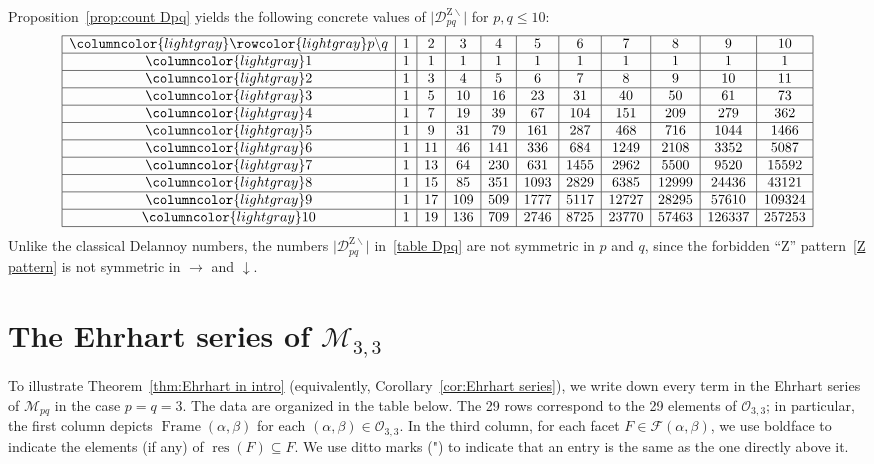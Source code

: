 \documentclass[noamsfonts,10pt]{amsart}
\newcommand{\M}{\mathcal{M}}
\newcommand{\DZ}{\mathcal{D}^{\mathrm{Z} \!\!\!\! \backslash}}
\newcommand{\al}{\alpha}
\newcommand{\be}{\beta}
\DeclareMathOperator{\Fr}{Frame}
\renewcommand{\O}{\mathcal{O}}
\newcommand{\F}{\mathcal{F}}
\newcommand{\res}{\operatorname{res}}
\newcommand{\1}{\mathbf{1}}
\theoremstyle{plain}
\theoremstyle{definition}
\numberwithin{equation}{section}
\begin{document}
Proposition~\ref{prop:count Dpq} yields the following concrete values of $\bigl| \DZ_{pq} \bigr|$ for $p,q \leq 10$:
\begin{equation}
    \label{table Dpq}
    \begin{array}{|>{\columncolor{lightgray}}c |c|c|c|c|c|c|c|c|c|c|}
    \hline
    \rowcolor{lightgray} p \backslash q & 1 & 2 & 3 & 4 & 5 & 6 & 7 & 8 & 9 & 10 \\ \hline
    1 & 1 & 1 & 1 & 1 & 1 & 1 & 1 & 1 & 1 & 1 \\ \hline
    2 & 1 & 3 & 4 & 5 & 6 & 7 & 8 & 9 & 10 & 11 \\ \hline
    3 & 1 & 5 & 10 & 16 & 23 & 31 & 40 & 50 & 61 & 73 \\ \hline
    4 & 1 & 7 & 19 & 39 & 67 & 104 & 151 & 209 & 279 & 362 \\ \hline
    5 & 1 & 9 & 31 & 79 & 161 & 287 & 468 & 716 & 1044 & 1466 \\ \hline
    6 & 1 & 11 & 46 & 141 & 336 & 684 & 1249 & 2108 & 3352 & 5087 \\ \hline
    7 & 1 & 13 & 64 & 230 & 631 & 1455 & 2962 & 5500 & 9520 & 15592 \\ \hline
    8 & 1 & 15 & 85 & 351 & 1093 & 2829 & 6385 & 12999 & 24436 & 43121 \\ \hline
    9 & 1 & 17 & 109 & 509 & 1777 & 5117 & 12727 & 28295 & 57610 & 109324 \\ \hline
    10 & 1 & 19 & 136 & 709 & 2746 & 8725 & 23770 & 57463 & 126337 & 257253 \\ \hline
    \end{array}
\end{equation}
Unlike the classical Delannoy numbers, the numbers $\bigl| \DZ_{pq} \bigr|$ in~\eqref{table Dpq} are not symmetric in $p$ and $q$, since the forbidden ``Z'' pattern~\eqref{Z pattern} is not symmetric in $\rightarrow$ and $\downarrow$.

\appendix

\section{The Ehrhart series \texorpdfstring{of $\M_{3,3}$}{for p=q=3}}
\label{appendix:3 by 3}

To illustrate Theorem~\ref{thm:Ehrhart in intro} (equivalently, Corollary~\ref{cor:Ehrhart series}), we write down every term in the Ehrhart series of $\M_{pq}$ in the case $p=q=3$.
The data are organized in the table below.
The 29 rows correspond to the 29 elements of $\O_{3,3}$;
in particular, the first column depicts $\Fr(\al,\be)$ for each $(\al,\be) \in \O_{3,3}$.
In the third column, for each facet $F \in \F(\al,\be)$, we use boldface to indicate the elements (if any) of $\res(F) \subseteq F$.
We use ditto marks (") to indicate that an entry is the same as the one directly above it.
\end{document}
